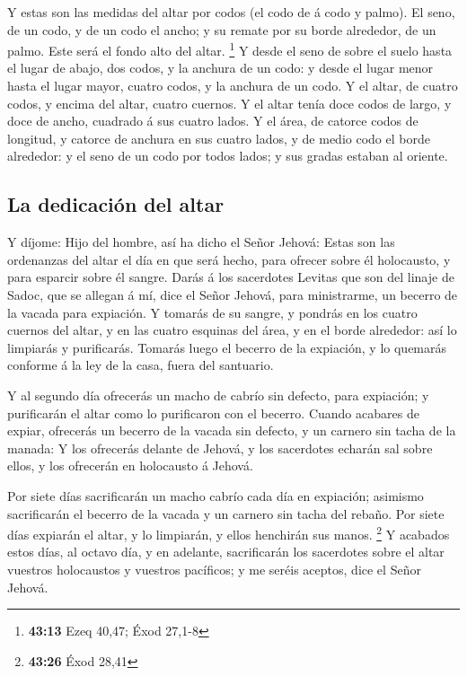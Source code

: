  Y estas son las medidas del altar por codos (el codo de á
codo y palmo). El seno, de un codo, y de un codo el ancho; y su remate
por su borde alrededor, de un palmo. Este será el fondo alto del altar.
\footnote{\textbf{43:13} Ezeq 40,47; Éxod 27,1-8}  Y desde
el seno de sobre el suelo hasta el lugar de abajo, dos codos, y la
anchura de un codo: y desde el lugar menor hasta el lugar mayor, cuatro
codos, y la anchura de un codo.  Y el altar, de cuatro
codos, y encima del altar, cuatro cuernos.  Y el altar
tenía doce codos de largo, y doce de ancho, cuadrado á sus cuatro lados.
 Y el área, de catorce codos de longitud, y catorce de
anchura en sus cuatro lados, y de medio codo el borde alrededor: y el
seno de un codo por todos lados; y sus gradas estaban al oriente.

\hypertarget{la-dedicaciuxf3n-del-altar}{%
\subsection{La dedicación del altar}\label{la-dedicaciuxf3n-del-altar}}

 Y díjome: Hijo del hombre, así ha dicho el Señor Jehová:
Estas son las ordenanzas del altar el día en que será hecho, para
ofrecer sobre él holocausto, y para esparcir sobre él sangre.
 Darás á los sacerdotes Levitas que son del linaje de
Sadoc, que se allegan á mí, dice el Señor Jehová, para ministrarme, un
becerro de la vacada para expiación.  Y tomarás de su
sangre, y pondrás en los cuatro cuernos del altar, y en las cuatro
esquinas del área, y en el borde alrededor: así lo limpiarás y
purificarás.  Tomarás luego el becerro de la expiación, y
lo quemarás conforme á la ley de la casa, fuera del santuario.

 Y al segundo día ofrecerás un macho de cabrío sin defecto,
para expiación; y purificarán el altar como lo purificaron con el
becerro.  Cuando acabares de expiar, ofrecerás un becerro
de la vacada sin defecto, y un carnero sin tacha de la manada:
 Y los ofrecerás delante de Jehová, y los sacerdotes
echarán sal sobre ellos, y los ofrecerán en holocausto á Jehová.

 Por siete días sacrificarán un macho cabrío cada día en
expiación; asimismo sacrificarán el becerro de la vacada y un carnero
sin tacha del rebaño.  Por siete días expiarán el altar, y
lo limpiarán, y ellos henchirán sus manos. \footnote{\textbf{43:26} Éxod
  28,41}  Y acabados estos días, al octavo día, y en
adelante, sacrificarán los sacerdotes sobre el altar vuestros
holocaustos y vuestros pacíficos; y me seréis aceptos, dice el Señor
Jehová.

